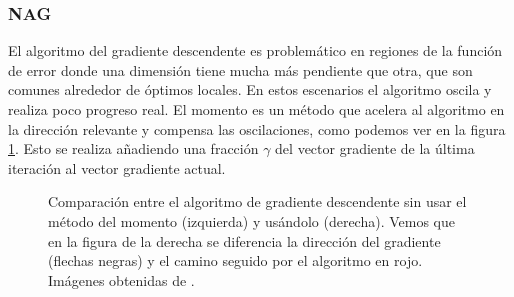 \subsubsection{NAG}

El algoritmo del gradiente descendente es problemático en regiones de la función de error donde una dimensión tiene mucha más pendiente que otra, que son comunes alrededor de óptimos locales. En estos escenarios el algoritmo oscila y realiza poco progreso real. El momento \cite{momentumorig} es un método que acelera al algoritmo en la dirección relevante y compensa las oscilaciones, como podemos ver en la figura \ref{fig:momentum}. Esto se realiza añadiendo una fracción $\gamma$ del vector gradiente de la última iteración al vector gradiente actual.

\begin{figure}[!tbp]
\label{fig:momentum}
  \centering
  \hfill
  \caption{Comparación entre el algoritmo de gradiente descendente sin usar el método del momento (izquierda) y usándolo (derecha). Vemos que en la figura de la derecha se diferencia la dirección del gradiente (flechas negras) y el camino seguido por el algoritmo en rojo. Imágenes obtenidas de \cite{GoodFellowBook}.}
\end{figure}

